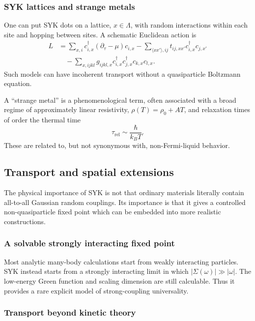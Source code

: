 \documentclass[11pt]{article}
\numberwithin{equation}{section}
\theoremstyle{exposition}
\theoremstyle{result}
\begin{document}
\subsubsection{SYK lattices and strange metals}

One can put SYK dots on a lattice, $x\in\Lambda$, with random interactions within each site and hopping between sites. A schematic Euclidean action is
\begin{align*}
L&=\sum_{x,i}c_{i,x}^\dagger(\partial_\tau-\mu)c_{i,x}
-\sum_{\langle xx'\rangle,ij}t_{ij,xx'}c_{i,x}^\dagger c_{j,x'}\\
&\quad
-\sum_{x,ijkl}g_{ijkl,x}
 c_{i,x}^\dagger c_{j,x}^\dagger c_{k,x}c_{l,x}.
\end{align*}
Such models can have incoherent transport without a quasiparticle Boltzmann equation.

A ``strange metal'' is a phenomenological term, often associated with a broad regime of approximately linear resistivity, $\rho(T)=\rho_0+AT$, and relaxation times of order the thermal time
\begin{equation*}
\tau_{\mathrm{rel}}\sim\frac{\hbar}{k_BT}.
\end{equation*}
These are related to, but not synonymous with, non-Fermi-liquid behavior.

\subsection{Transport and spatial extensions}

The physical importance of SYK is not that ordinary materials literally contain all-to-all Gaussian random couplings. Its importance is that it gives a controlled non-quasiparticle fixed point which can be embedded into more realistic constructions.

\subsubsection{A solvable strongly interacting fixed point}

Most analytic many-body calculations start from weakly interacting particles. SYK instead starts from a strongly interacting limit in which $|\Sigma(\omega)|\gg|\omega|$. The low-energy Green function and scaling dimension are still calculable. Thus it provides a rare explicit model of strong-coupling universality.

\subsubsection{Transport beyond kinetic theory}
\end{document}
